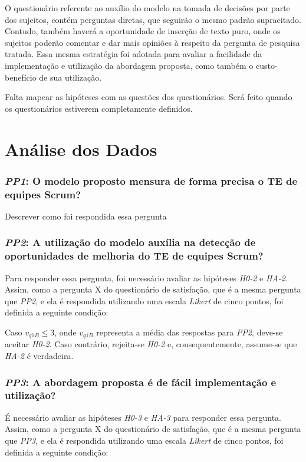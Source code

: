 O questionário referente ao auxílio do modelo na tomada de decisões por parte dos sujeitos, contém perguntas diretas, que seguirão o mesmo padrão supracitado. Contudo, também haverá a oportunidade de inserção de texto puro, onde os sujeitos poderão comentar e dar mais opiniões à respeito da pergunta de pesquisa tratada. Essa mesma estratégia foi adotada para avaliar a facilidade da implementação e utilização da abordagem proposta, como também o custo-benefício de sua utilização.

{\color{red} Falta mapear as hipóteses com as questões dos questionários. Será feito quando os questionários estiverem completamente definidos.}

\section{Análise dos Dados}
\label{estudodecaso:analise}

\subsubsection{\textit{PP1}: O modelo proposto mensura de forma precisa o TE de equipes Scrum?}

{\color{red} Descrever como foi respondida essa pergunta}

\subsubsection{\textit{PP2}: A utilização do modelo auxília na detecção de oportunidades de melhoria do TE de equipes Scrum?}

Para responder essa pergunta, foi necessário avaliar as hipóteses \textit{H0-2} e \textit{HA-2}. Assim, como a pergunta X do questionário de satisfação, que é a mesma pergunta que \textit{PP2}, e ela é respondida utilizando uma escala \textit{Likert} de cinco pontos, foi definida a seguinte condição:

Caso $v_{q1B} \le 3$, onde $v_{q1B}$ representa a média das respostas para \textit{PP2}, deve-se aceitar \textit{H0-2}. Caso contrário, rejeita-se \textit{H0-2} e, consequentemente, assume-se que \textit{HA-2} é verdadeira.

\subsubsection{\textit{PP3}: A abordagem proposta é de fácil implementação e utilização?}

É necessário avaliar as hipóteses \textit{H0-3} e \textit{HA-3} para responder essa pergunta. Assim, como a pergunta X do questionário de satisfação, que é a mesma pergunta que \textit{PP3}, e ela é respondida utilizando uma escala \textit{Likert} de cinco pontos, foi definida a seguinte condição:

